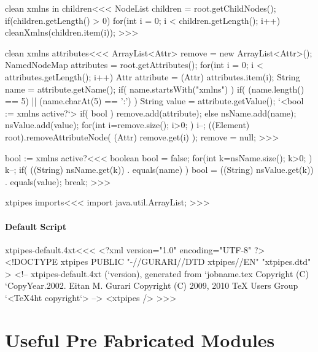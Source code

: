 \documentclass{article}
\begin{document}
\<clean xmlns in children\><<<
NodeList children = root.getChildNodes();
if(children.getLength() > 0) {
   for(int i = 0; i < children.getLength(); i++) {
      cleanXmlns(children.item(i));
}  }
>>>

\<clean xmlns attributes\><<<
ArrayList<Attr> remove = new ArrayList<Attr>();
NamedNodeMap attributes = root.getAttributes();
for(int i = 0; i < attributes.getLength(); i++) {
   Attr attribute = (Attr) attributes.item(i);
   String name = attribute.getName();
   if( name.startsWith("xmlns") ){
     if( (name.length() == 5) || (name.charAt(5) == ':') ){
        String value = attribute.getValue();
        `<bool := xmlns active?`>
        if( bool ){ remove.add(attribute);
        } else { nsName.add(name); nsValue.add(value); }
}  } }
for(int i=remove.size(); i>0; ){
   i--;
  ((Element) root).removeAttributeNode( (Attr) remove.get(i) );
}
remove = null;
>>>

\<bool := xmlns active?\><<<
boolean bool = false;
for(int k=nsName.size(); k>0; ){
  k--;
  if( ((String) nsName.get(k)) . equals(name) ){
     bool = ((String) nsValue.get(k)) . equals(value);
     break;
} }
>>>

\<xtpipes imports\><<<
import java.util.ArrayList;
>>>



\subsection{Default Script}

\expandafter\AddFile{}

\<xtpipes-default.4xt\><<<
<?xml version="1.0" encoding="UTF-8" ?>
<!DOCTYPE xtpipes PUBLIC "-//GURARI//DTD xtpipes//EN" "xtpipes.dtd"  >
<!-- xtpipes-default.4xt (`version), generated from `jobname.tex
     Copyright (C) `CopyYear.2002. Eitan M. Gurari
     Copyright (C) 2009, 2010 TeX Users Group
`<TeX4ht copyright`> -->
<xtpipes />
>>>












\part{Useful Pre Fabricated Modules}
\end{document}
